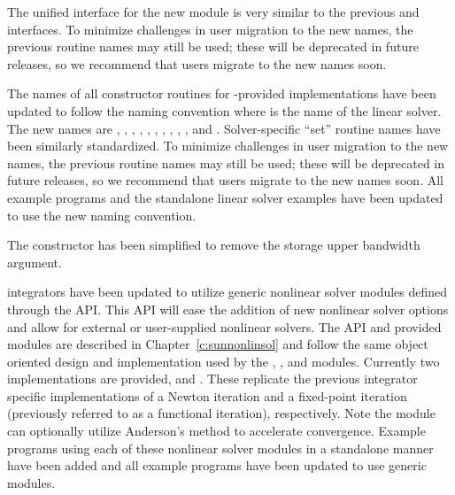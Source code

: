 The unified interface for the new {\cvls} module is very similar to the
previous {\cvdls} and {\cvspils} interfaces. To minimize challenges in user
migration to the new names, the previous {\CC} routine names may still
be used; these will be deprecated in future releases, so we recommend that users
migrate to the new names soon.

The names of all constructor routines for {\sundials}-provided
{\sunlinsol} implementations have been updated to follow the naming convention
 where \id{*} is the name of the linear solver. The new names
are
,
,
,
,\newline
{},
,
,
,
,
, and
.  Solver-specific ``set'' routine names have
been similarly standardized.  To minimize challenges in user migration
to the new names, the previous routine names may still be used; these
will be deprecated in future releases, so we recommend that users
migrate to the new names soon. All {\cvodes} example programs and the standalone
linear solver examples have been updated to use the new naming convention.

The  constructor has been simplified to remove the
storage upper bandwidth argument.

{\sundials} integrators have been updated to utilize generic nonlinear solver
modules defined through the {\sunnonlinsol} API. This API will ease the addition
of new nonlinear solver options and allow for external or user-supplied
nonlinear solvers. The {\sunnonlinsol} API and {\sundials} provided modules are
described in Chapter~\ref{c:sunnonlinsol} and follow the same object oriented
design and implementation used by the {\nvector}, {\sunmatrix}, and {\sunlinsol}
modules. Currently two {\sunnonlinsol} implementations are provided,
{\sunnonlinsolnewton} and {\sunnonlinsolfixedpoint}. These replicate the
previous integrator specific implementations of a Newton iteration and a
fixed-point iteration (previously referred to as a functional iteration),
respectively. Note the {\sunnonlinsolfixedpoint} module can optionally utilize
Anderson's method to accelerate convergence. Example programs using each of
these nonlinear solver modules in a standalone manner have been added and all
{\cvodes} example programs have been updated to use generic {\sunnonlinsol}
modules.

